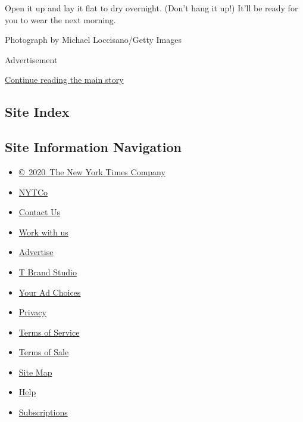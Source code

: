 Open it up and lay it flat to dry overnight. (Don't hang it up!) It'll
be ready for you to wear the next morning.

Photograph by Michael Loccisano/Getty Images

Advertisement

\protect\hyperlink{after-bottom}{Continue reading the main story}

\hypertarget{site-index}{%
\subsection{Site Index}\label{site-index}}

\hypertarget{site-information-navigation}{%
\subsection{Site Information
Navigation}\label{site-information-navigation}}

\begin{itemize}
\tightlist
\item
  \href{https://help.nytimes.com/hc/en-us/articles/115014792127-Copyright-notice}{©~2020~The
  New York Times Company}
\end{itemize}

\begin{itemize}
\tightlist
\item
  \href{https://www.nytco.com/}{NYTCo}
\item
  \href{https://help.nytimes.com/hc/en-us/articles/115015385887-Contact-Us}{Contact
  Us}
\item
  \href{https://www.nytco.com/careers/}{Work with us}
\item
  \href{https://nytmediakit.com/}{Advertise}
\item
  \href{http://www.tbrandstudio.com/}{T Brand Studio}
\item
  \href{https://www.nytimes.com/privacy/cookie-policy\#how-do-i-manage-trackers}{Your
  Ad Choices}
\item
  \href{https://www.nytimes.com/privacy}{Privacy}
\item
  \href{https://help.nytimes.com/hc/en-us/articles/115014893428-Terms-of-service}{Terms
  of Service}
\item
  \href{https://help.nytimes.com/hc/en-us/articles/115014893968-Terms-of-sale}{Terms
  of Sale}
\item
  \href{https://spiderbites.nytimes.com}{Site Map}
\item
  \href{https://help.nytimes.com/hc/en-us}{Help}
\item
  \href{https://www.nytimes.com/subscription?campaignId=37WXW}{Subscriptions}
\end{itemize}
